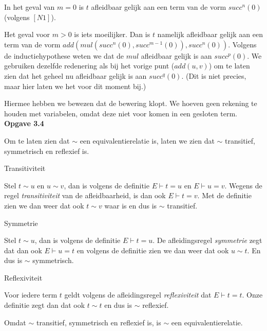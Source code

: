 \documentclass[a4paper,11pt]{article}
\begin{document}
\begin{description}
\begin{description}
    In het geval van $m=0$ is $t$ afleidbaar gelijk aan een term van de vorm
    $succ^{n}(0)$ (volgens $[N1]$).

    Het geval voor $m>0$ is iets moeilijker. Dan is $t$ namelijk afleidbaar
    gelijk aan een term van de vorm $add(mul(succ^{n}(0), succ^{m-1}(0)),
    succ^{n}(0))$. Volgens de inductiehypothese weten we dat de $mul$
    afleidbaar gelijk is aan $succ^{p}(0)$. We gebruiken dezelfde redenering
    als bij het vorige punt ($add(u, v)$) om te laten zien dat het geheel nu
    afleidbaar gelijk is aan $succ^{q}(0)$. (Dit is niet precies, maar hier
    laten we het voor dit moment bij.)

  \end{description}

\end{description}

Hiermee hebben we bewezen dat de bewering klopt. We hoeven geen rekening te
houden met variabelen, omdat deze niet voor komen in een gesloten term.\\[2em]


{\bf Opgave 3.4} %

Om te laten zien dat $\sim$ een equivalentierelatie is, laten we zien dat $\sim$
transitief, symmetrisch en reflexief is.

\begin{description}

\item{Transitiviteit}

  Stel $t \sim u$ en $u \sim v$, dan is volgens de definitie $E \vdash t = u$ en
  $E \vdash u = v$. Wegens de regel \emph{transitiviteit} van de
  afleidbaarheid, is dan ook $E \vdash t = v$. Met de definitie zien we dan
  weer dat ook $t \sim v$ waar is en dus is $\sim$ transitief.

\item{Symmetrie}

  Stel $t \sim u$, dan is volgens de definitie $E \vdash t = u$. De
  afleidingsregel \emph{symmetrie} zegt dat dan ook $E \vdash u = t$ en
  volgens de definitie zien we dan weer dat ook $u \sim t$. En dus is $\sim$
  symmetrisch.

\item{Reflexiviteit}

  Voor iedere term $t$ geldt volgens de afleidingsregel \emph{reflexiviteit}
  dat $E \vdash t = t$. Onze definitie zegt dan dat ook $t \sim t$ en dus is
  $\sim$ reflexief.

\end{description}

Omdat $\sim$ transitief, symmetrisch en reflexief is, is $\sim$ een
equivalentierelatie.
\end{document}

